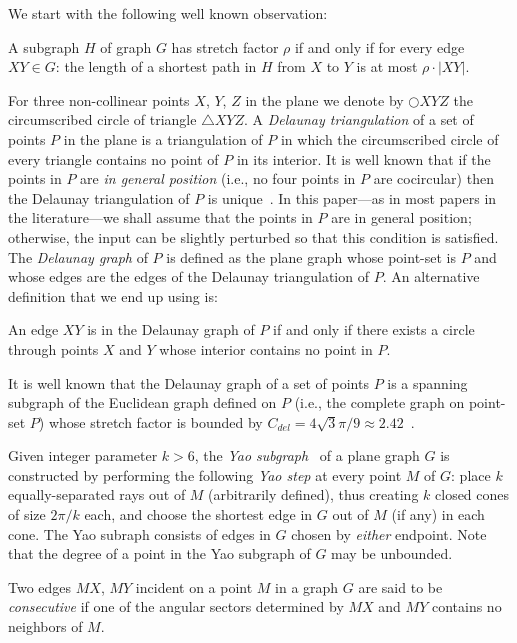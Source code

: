 \documentclass{stacs_proc}
\theoremstyle{plain}\newtheorem{satz}[thm]{Satz}
\begin{document}
We start with the following well known observation:
\begin{observation} \label{optimal} A subgraph $H$ of graph $G$ has
stretch factor $\rho$ if and only if for every edge $XY \in G$: the
length of a shortest path in $H$ from $X$ to $Y$ is at most $\rho
\cdot |XY|$.
\end{observation}
For three non-collinear points $X$, $Y$, $Z$ in the plane we denote
by $\bigcirc{XYZ}$ the circumscribed circle of triangle
$\triangle{XYZ}$. A {\em Delaunay triangulation} of a set of points $P$ in
the plane is a triangulation of $P$ in which the circumscribed circle of every
triangle contains no point of $P$ in its interior. It is well known
that if the points in $P$ are {\em in general position} (i.e., no
four points in $P$ are cocircular) then the Delaunay triangulation
of $P$ is unique~\cite{book}. In this paper---as in most papers in
the literature---we shall assume that the points in $P$ are in
general position; otherwise, the input can be slightly perturbed so
that this condition is satisfied. The {\em Delaunay graph} of $P$ is
defined as the plane graph whose point-set is $P$ and whose edges
are the edges of the Delaunay triangulation of $P$. An alternative definition
that we end up using is:
\begin{definition}
\label{DelaunayDef}
An edge $XY$ is in the Delaunay graph of $P$ if and only if there exists a
circle through points $X$ and $Y$ whose interior contains no point in $P$.
\end{definition}
It is well known
that the Delaunay graph of a set of points $P$ is a spanning
subgraph of the Euclidean graph defined on $P$ (i.e., the complete
graph on point-set $P$) whose stretch factor is bounded by $C_{del}
= 4\sqrt{3} \pi /9 \approx 2.42$~\cite{keil}.

Given integer parameter $k > 6$, the {\em Yao subgraph}~\cite{yao}
of a plane graph $G$ is constructed by performing the
following {\em Yao step} at every point $M$ of $G$: place $k$ equally-separated
rays out of $M$ (arbitrarily defined), thus creating $k$ closed cones of
size $2\pi/k$ each, and choose the shortest edge in $G$ out of $M$ (if
any) in each cone. The Yao subraph consists of edges in $G$ chosen by
{\em either} endpoint. Note that the degree of a point in the Yao subgraph
of $G$ may be unbounded.

Two edges $MX$, $MY$ incident on a point $M$ in a graph $G$ are said
to be {\em consecutive} if one of the angular sectors determined by
$MX$ and $MY$ contains no neighbors of $M$.
\end{document}

